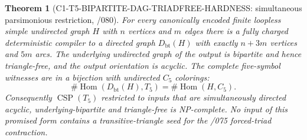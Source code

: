 \documentclass[11pt]{article}
\newtheorem{theorem}{Theorem}
\begin{document}
\begin{theorem}[C1-T5-BIPARTITE-DAG-TRIADFREE-HARDNESS: simultaneous parsimonious restriction, /080]
For every canonically encoded finite loopless simple undirected graph
$H$ with $n$ vertices and $m$ edges there is a fully charged
deterministic compiler to a directed graph $D_{\mathrm{bt}}(H)$ with
exactly $n+3m$ vertices and $5m$ arcs.  The underlying undirected
graph of the output is bipartite and hence triangle-free, and
the output orientation is acyclic.  The complete five-symbol
witnesses are in a bijection with undirected $C_5$ colorings:
\[
 \boxed{\#\operatorname{Hom}(D_{\mathrm{bt}}(H),T_5)
  =\#\operatorname{Hom}(H,C_5).}
\]
Consequently $\operatorname{CSP}(T_5)$ restricted to inputs that are
simultaneously directed acyclic, underlying-bipartite and triangle-free
is NP-complete.  No input of this promised form contains a
transitive-triangle seed for the /075 forced-triad contraction.
\end{theorem}
\end{document}

